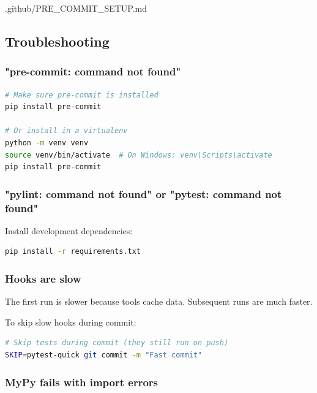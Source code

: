\begin{relocated}{.github/PRE_COMMIT_SETUP.md}
\subsection{Troubleshooting}\label{um:flow:pre-commit-setup:troubleshooting}

\subsubsection{"pre-commit: command not found"}\label{um:flow:pre-commit-setup:pre-commit-command-not-found}

\begin{lstlisting}[language=bash]
# Make sure pre-commit is installed
pip install pre-commit

# Or install in a virtualenv
python -m venv venv
source venv/bin/activate  # On Windows: venv\Scripts\activate
pip install pre-commit
\end{lstlisting}

\subsubsection{"pylint: command not found" or "pytest: command not
found"}\label{um:flow:pre-commit-setup:pylint-command-not-found-or-pytest-command-not-found}

Install development dependencies:

\begin{lstlisting}[language=bash]
pip install -r requirements.txt
\end{lstlisting}

\subsubsection{Hooks are slow}\label{um:flow:pre-commit-setup:hooks-are-slow}

The first run is slower because tools cache data. Subsequent runs are
much faster.

To skip slow hooks during commit:

\begin{lstlisting}[language=bash]
# Skip tests during commit (they still run on push)
SKIP=pytest-quick git commit -m "Fast commit"
\end{lstlisting}

\subsubsection{MyPy fails with import errors}\label{um:flow:pre-commit-setup:mypy-fails-with-import-errors}


\end{relocated}
